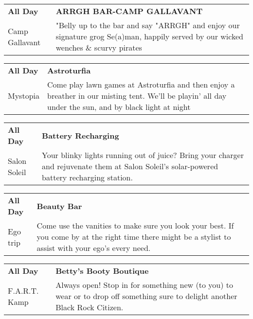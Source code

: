 \begin{tabular}{ p{1in} p{2.2in} }
    \textbf{All Day} & \textbf{ARRGH BAR-CAMP GALLAVANT} \\
    Camp Gallavant \newline  & "Belly up to the bar and say "ARRGH" and enjoy our signature grog Se(a)man, happily served by our wicked wenches \& scurvy pirates \\
    \hline 
\end{tabular}
    
\begin{tabular}{ p{1in} p{2.2in} }
    \textbf{All Day} & \textbf{Astroturfia} \\
    Mystopia \newline  & Come play lawn games at Astroturfia and then enjoy a breather in our misting tent. We'll be playin' all day under the sun, and by black light at night \\
    \hline 
\end{tabular}
    
\begin{tabular}{ p{1in} p{2.2in} }
    \textbf{All Day} & \textbf{Battery Recharging} \\
    Salon Soleil \newline  & Your blinky lights running out of juice? Bring your charger and rejuvenate them at Salon Soleil's solar-powered battery recharging station. \\
    \hline 
\end{tabular}
    
\begin{tabular}{ p{1in} p{2.2in} }
    \textbf{All Day} & \textbf{Beauty Bar} \\
    Ego trip \newline  & Come use the vanities to make sure you look your best. If you come by at the right time there might be a stylist to assist with your ego's every need. \\
    \hline 
\end{tabular}
    
\begin{tabular}{ p{1in} p{2.2in} }
    \textbf{All Day} & \textbf{Betty's Booty Boutique} \\
    F.A.R.T. Kamp \newline  & Always open! Stop in for something new (to you) to wear or to drop off something sure to delight another Black Rock Citizen. \\
    \hline 
\end{tabular}
    
